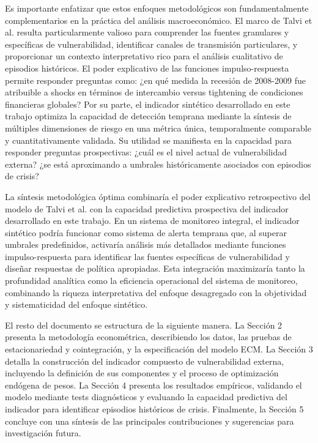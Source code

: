 \documentclass[3p,11pt]{elsarticle}
\begin{document}
Es importante enfatizar que estos enfoques metodológicos son fundamentalmente complementarios en la práctica del análisis macroeconómico. El marco de Talvi et al. resulta particularmente valioso para comprender las fuentes granulares y específicas de vulnerabilidad, identificar canales de transmisión particulares, y proporcionar un contexto interpretativo rico para el análisis cualitativo de episodios históricos. El poder explicativo de las funciones impulso-respuesta permite responder preguntas como: ¿en qué medida la recesión de 2008-2009 fue atribuible a shocks en términos de intercambio versus tightening de condiciones financieras globales? Por su parte, el indicador sintético desarrollado en este trabajo optimiza la capacidad de detección temprana mediante la síntesis de múltiples dimensiones de riesgo en una métrica única, temporalmente comparable y cuantitativamente validada. Su utilidad se manifiesta en la capacidad para responder preguntas prospectivas: ¿cuál es el nivel actual de vulnerabilidad externa? ¿se está aproximando a umbrales históricamente asociados con episodios de crisis?

La síntesis metodológica óptima combinaría el poder explicativo retrospectivo del modelo de Talvi et al. con la capacidad predictiva prospectiva del indicador desarrollado en este trabajo. En un sistema de monitoreo integral, el indicador sintético podría funcionar como sistema de alerta temprana que, al superar umbrales predefinidos, activaría análisis más detallados mediante funciones impulso-respuesta para identificar las fuentes específicas de vulnerabilidad y diseñar respuestas de política apropiadas. Esta integración maximizaría tanto la profundidad analítica como la eficiencia operacional del sistema de monitoreo, combinando la riqueza interpretativa del enfoque desagregado con la objetividad y sistematicidad del enfoque sintético.

El resto del documento se estructura de la siguiente manera. La Sección 2 presenta la metodología econométrica, describiendo los datos, las pruebas de estacionariedad y cointegración, y la especificación del modelo ECM. La Sección 3 detalla la construcción del indicador compuesto de vulnerabilidad externa, incluyendo la definición de sus componentes y el proceso de optimización endógena de pesos. La Sección 4 presenta los resultados empíricos, validando el modelo mediante tests diagnósticos y evaluando la capacidad predictiva del indicador para identificar episodios históricos de crisis. Finalmente, la Sección 5 concluye con una síntesis de las principales contribuciones y sugerencias para investigación futura.
\end{document}

